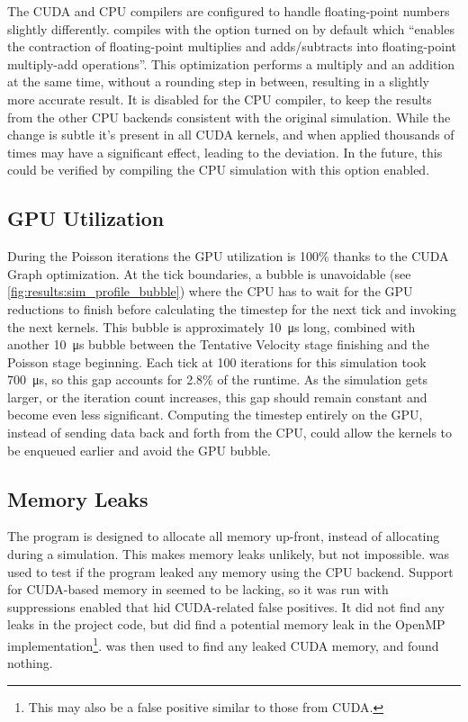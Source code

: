 The CUDA and CPU compilers are configured to handle floating-point numbers slightly differently.
 compiles with the  option turned on by default\cite{NvccFmad} which ``enables the contraction of floating-point multiplies and adds/subtracts into floating-point multiply-add operations''.
This optimization performs a multiply and an addition at the same time, without a rounding step in between, resulting in a slightly more accurate result\cite{NvidiaFMAJustification}.
It is disabled for the CPU compiler, to keep the results from the other CPU backends consistent with the original simulation.
While the change is subtle it's present in all CUDA kernels, and when applied thousands of times may have a significant effect, leading to the deviation.
In the future, this could be verified by compiling the CPU simulation with this option enabled.

\clearpage
\pagebreak

\subsection{GPU Utilization}\label{sec:Results:Sim:Efficiency}

During the Poisson iterations the GPU utilization is 100\% thanks to the CUDA Graph optimization.
At the tick boundaries, a bubble is unavoidable (see \cref{fig:results:sim_profile_bubble}) where the CPU has to wait for the GPU reductions to finish before calculating the timestep for the next tick and invoking the next kernels.
This bubble is approximately \SI{10}{\micro\second} long, combined with another \SI{10}{\micro\second} bubble between the Tentative Velocity stage finishing and the Poisson stage beginning.
Each tick at 100 iterations for this simulation took \SI{700}{\micro\second}, so this gap accounts for 2.8\% of the runtime.
As the simulation gets larger, or the iteration count increases, this gap should remain constant and become even less significant.
Computing the timestep entirely on the GPU, instead of sending data back and forth from the CPU, could allow the kernels to be enqueued earlier and avoid the GPU bubble.

\subsection{Memory Leaks}\label{sec:Results:Sim:Mem}
The program is designed to allocate all memory up-front, instead of allocating during a simulation.
This makes memory leaks unlikely, but not impossible.
 was used to test if the program leaked any memory using the CPU backend.
Support for CUDA-based memory in  seemed to be lacking, so it was run with suppressions enabled that hid CUDA-related false positives.
It did not find any leaks in the project code, but did find a potential memory leak in the OpenMP implementation\footnote{This may also be a false positive similar to those from CUDA.}.
 was then used to find any leaked CUDA memory, and found nothing.%


